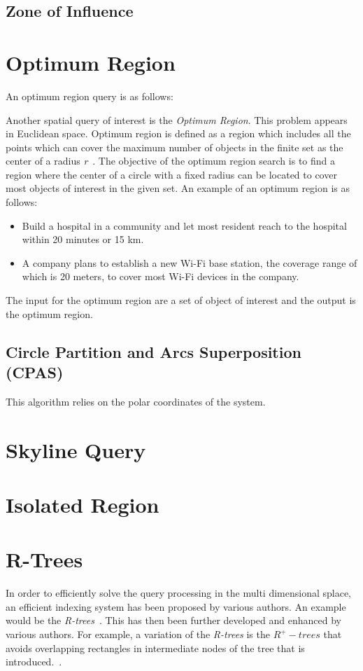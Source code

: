 \documentclass[a4paper,11pt]{article}
\begin{document}
\subsection{Zone of Influence}
 

\section{Optimum Region} 

An optimum region query is as follows: 

Another spatial query of interest is the \textit{Optimum Region}. This problem appears in Euclidean space. Optimum region is defined as a region which includes all the points which can cover the maximum number of objects in the finite set as the center of a radius \textit{r}~\cite{Xuan2012}. The objective of the optimum region search is to find a region where the center of a circle with a fixed radius can be located to cover most objects of interest in the given set. An example of an optimum region is as follows:


\begin{itemize}      
  \item Build a hospital in a community and let most
resident reach to the hospital within 20 minutes or 15 km.      
  \item A company plans to establish a new Wi-Fi base station, the coverage range of
which is 20 meters, to cover most Wi-Fi   devices in the company.
\end{itemize}

The input for the optimum region are a set of object of interest and the output is the optimum region. 

\subsection{Circle Partition and Arcs Superposition (CPAS)}
This algorithm relies on the polar coordinates of the system.

\section{Skyline Query}


\section{Isolated Region}

\section{R-Trees}
In order to efficiently solve the query processing in the multi dimensional splace, an efficient indexing system has been proposed by various authors. An example would be the \textit{R-trees}~\cite{guttman1984r}. This has then been further developed and enhanced by various authors. For example, a variation of the \textit{R-trees} is the $R^+ -trees$ that avoids overlapping rectangles in intermediate nodes of the tree that is introduced.~\cite{beckmann1990r}.
\end{document}
